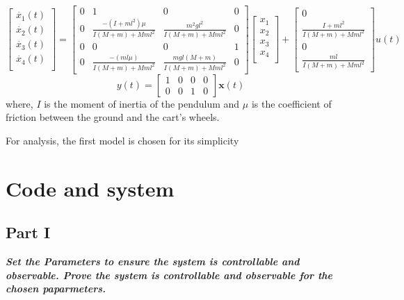 \documentclass[11pt]{article}
\begin{document}
\[
\begin{bmatrix}
    \dot{x_1}(t)\\
    \dot{x_2}(t)\\
    \dot{x_3}(t)\\
    \dot{x_4}(t)\\
\end{bmatrix} = \begin{bmatrix}
    0 & 1 & 0 & 0 \\
    0 & \frac{-(I+ml^2)\mu}{I(M+m)+Mml^2} & \frac{m^2gl^2}{I(M+m)+Mml^2} &  0\\
    0 &      0      &        0    &       1\\
    0 &  \frac{-(ml\mu)}{I(M+m)+Mml^2}  &     \frac{mgl(M+m)}{I(M+m)+Mml^2} &  0 
\end{bmatrix}\begin{bmatrix}
    x_1 \\
    x_2 \\
    x_3 \\
    x_4 \\
    \end{bmatrix}+ \begin{bmatrix}
    0 \\ \frac{I+ml^2}{I(M+m)+Mml^2} \\ 0 \\ \frac{ml}{I(M+m)+Mml^2}
    \end{bmatrix} u(t) 
    \]\[
    y(t) = \begin{bmatrix}
    1 & 0 & 0 & 0\\
    0 & 0 & 1 & 0
    \end{bmatrix}\mathbf{x}(t)
\]
where, $I$ is the moment of inertia of the pendulum and $\mu$ is
the coefficient of friction between the ground and the cart's wheels.

For analysis, the first model is chosen for its simplicity

\section{Code and system}\label{code-and-system}

\subsection{Part I}\label{part-i}

\textbf{\emph{Set the Parameters to ensure the system is controllable
and observable. Prove the system is controllable and observable for the
chosen paparmeters.}}
\end{document}
